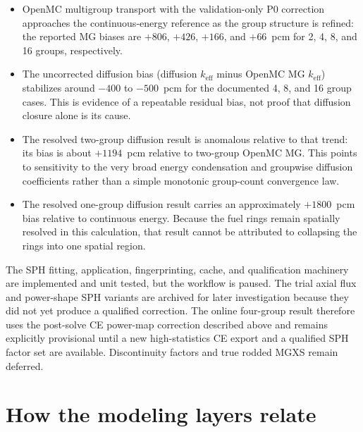 \documentclass[11pt]{article}
\begin{document}
\begin{itemize}
  \item OpenMC multigroup transport with the validation-only P0 correction
        approaches the continuous-energy reference as the group structure is
        refined: the reported MG biases are $+806$, $+426$, $+166$, and
        $+66$~pcm for 2, 4, 8, and 16 groups, respectively.
  \item The uncorrected diffusion bias (diffusion $k_{\mathrm{eff}}$ minus
        OpenMC MG $k_{\mathrm{eff}}$) stabilizes around $-400$ to $-500$~pcm
        for the documented 4, 8, and 16 group cases.  This is evidence of a
        repeatable residual bias, not proof that diffusion closure alone is
        its cause.
  \item The resolved two-group diffusion result is anomalous relative to that
        trend: its bias is about $+1194$~pcm relative to two-group OpenMC MG.
        This points to sensitivity to the very broad energy condensation and
        groupwise diffusion coefficients rather than a simple monotonic
        group-count convergence law.
  \item The resolved one-group diffusion result carries an approximately
        $+1800$~pcm bias relative to continuous energy.  Because the fuel rings
        remain spatially resolved in this calculation, that result cannot be
        attributed to collapsing the rings into one spatial region.
\end{itemize}

The SPH fitting, application, fingerprinting, cache, and qualification
machinery are implemented and unit tested, but the workflow is paused.  The
trial axial flux and power-shape SPH variants are archived for later
investigation because they did not yet produce a qualified correction.  The
online four-group result therefore uses the post-solve CE power-map correction
described above and remains explicitly provisional until a new high-statistics
CE export and a qualified SPH factor set are available.  Discontinuity factors
and true rodded MGXS remain deferred.

\section{How the modeling layers relate}
\end{document}
